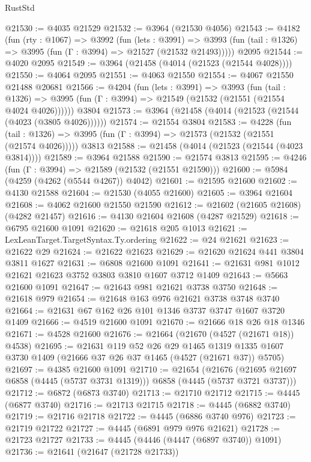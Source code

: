 \begin{lexlean}{RustStd}
\begin{coremodule}
{\begin{coremodule}
{{{{{{{{{{{{{{{{{{{{{{{{{{{{{{{{{{{{{{@21530 := @4035 @21529
@21532 := @3964 (@21530 @4056)
@21543 := @4182
    (fun (rty : @1067) =>
    @3992
      (fun (lets : @3991) =>
      @3993 (fun (tail : @1326) => @3995 (fun (Γ : @3994) => @21527 (@21532 @21493)))))
    @2095
@21544 := @4020 @2095
@21549 := @3964 (@21458 (@4014 (@21523 (@21544 @4028))))
@21550 := @4064 @2095
@21551 := @4063 @21550
@21554 := @4067 @21550 @21488 @20681
@21566 := @4204
    (fun (lets : @3991) =>
    @3993
      (fun (tail : @1326) =>
      @3995 (fun (Γ : @3994) => @21549 (@21532 (@21551 (@21554 @4024 @4026))))))
    @3804
@21573 := @3964 (@21458 (@4014 (@21523 (@21544 (@4023 (@3805 @4026))))))
@21574 := @21554 @3804
@21583 := @4228
    (fun (tail : @1326) => @3995 (fun (Γ : @3994) => @21573 (@21532 (@21551 (@21574 @4026)))))
    @3813
@21588 := @21458 (@4014 (@21523 (@21544 (@4023 @3814))))
@21589 := @3964 @21588
@21590 := @21574 @3813
@21595 := @4246 (fun (Γ : @3994) => @21589 (@21532 (@21551 @21590)))
@21600 := @5984 (@4259 (@4262 (@5544 @4267)) @4042)
@21601 := @21595 @21600
@21602 := @4130 @21588
@21604 := @21530 (@4055 @21600)
@21605 := @3964 @21604
@21608 := @4062 @21600 @21550 @21590
@21612 := @21602 (@21605 @21608) (@4282 @21457)
@21616 := @4130 @21604 @21608 (@4287 @21529)
@21618 := @6795 @21600 @1091
@21620 := @21618 @205 @1013
@21621 := LexLeanTarget.TargetSyntax.Ty.ordering
@21622 := @24 @21621
@21623 := @21622 @29
@21624 := @21622 @21623
@21629 := @21620 @21624 @441 @3804 @3811 @1627
@21631 := @6808 @21600 @1091
@21641 := @21631 @981 @1012 @21621 @21623 @3752 @3803 @3810 @1607 @3712 @1409
@21643 := @5663 @21600 @1091
@21647 := @21643 @981 @21621 @3738 @3750
@21648 := @21618 @979
@21654 := @21648 @163 @976 @21621 @3738 @3748 @3740
@21664 := @21631 @67 @162 @26 @101 @1346 @3737 @3747 @1607 @3720 @1409
@21666 := @4519 @21600 @1091
@21670 := @21666 @18 @26 @18 @1346
@21671 := @4528 @21600
@21676 := @21664 (@21670 (@4527 (@21671 @18)) @4538)
@21695 := @21631
    @119
    @52
    @26
    @29
    @1465
    @1319
    @1335
    @1607
    @3730
    @1409
    (@21666 @37 @26 @37 @1465 (@4527 (@21671 @37)) @5705)
@21697 := @4385 @21600 @1091
@21710 := @21654
    (@21676 (@21695 @21697 @6858 (@4445 (@5737 @3731 @1319))) @6858 (@4445 (@5737 @3721 @3737)))
@21712 := @6872 (@6873 @3740)
@21713 := @21710 @21712
@21715 := @4445 (@6877 @3740)
@21716 := @21713 @21715
@21718 := @4445 (@6882 @3740)
@21719 := @21716 @21718
@21722 := @4445 (@6886 @3740 @976)
@21723 := @21719 @21722
@21727 := @4445 (@6891 @979 @976 @21621)
@21728 := @21723 @21727
@21733 := @4445 (@4446 (@4447 (@6897 @3740)) @1091)
@21736 := @21641 (@21647 (@21728 @21733))
}}}}}}}}}}}}}}}}}}}}}}}}}}}}}}}}}}}}}}
\end{coremodule}}
\end{coremodule}
\end{lexlean}
